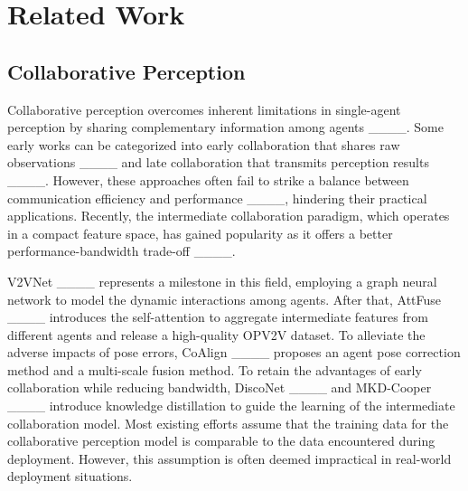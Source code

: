 \section{Related Work}
\subsection{Collaborative Perception}
Collaborative perception overcomes inherent limitations in single-agent perception by sharing complementary information among agents ____. Some early works can be categorized into early collaboration that shares raw observations ____ and late collaboration that transmits perception results ____. However, these approaches often fail to strike a balance between communication efficiency and performance ____, hindering their practical applications. Recently, the intermediate collaboration paradigm, which operates in a compact feature space, has gained popularity as it offers a better performance-bandwidth trade-off ____.

V2VNet ____ represents a milestone in this field, employing a graph neural network to model the dynamic interactions among agents. After that, AttFuse ____ introduces the self-attention to aggregate intermediate features from different agents and release a high-quality OPV2V dataset. To alleviate the adverse impacts of pose errors, CoAlign ____ proposes an agent pose correction method and a multi-scale fusion method. To retain the advantages of early collaboration while reducing bandwidth, DiscoNet ____ and MKD-Cooper ____ introduce knowledge distillation to guide the learning of the intermediate collaboration model. Most existing efforts assume that the training data for the collaborative perception model is comparable to the data encountered during deployment. However, this assumption is often deemed impractical in real-world deployment situations.


